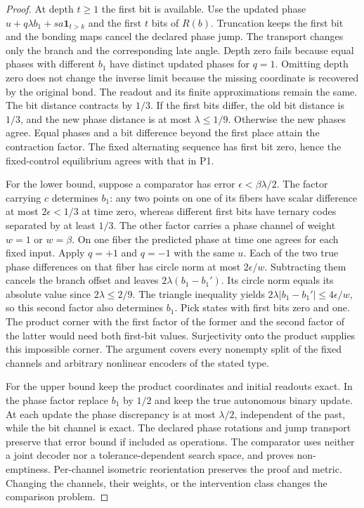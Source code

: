 \documentclass[11pt,a4paper]{article}
\theoremstyle{definition}
\begin{document}
\begin{proof}
At depth $t\ge1$ the first bit is available. Use the updated phase $u+q\lambda b_1+sa\mathbf 1_{t>k}$ and the first $t$ bits of $R(b)$. Truncation keeps the first bit and the bonding maps cancel the declared phase jump. The transport changes only the branch and the corresponding late angle. Depth zero fails because equal phases with different $b_1$ have distinct updated phases for $q=1$. Omitting depth zero does not change the inverse limit because the missing coordinate is recovered by the original bond. The readout and its finite approximations remain the same. The bit distance contracts by $1/3$. If the first bits differ, the old bit distance is $1/3$, and the new phase distance is at most $\lambda\le1/9$. Otherwise the new phases agree. Equal phases and a bit difference beyond the first place attain the contraction factor. The fixed alternating sequence has first bit zero, hence the fixed-control equilibrium agrees with that in P1.

For the lower bound, suppose a comparator has error $\epsilon<\beta\lambda/2$. The factor carrying $c$ determines $b_1$: any two points on one of its fibers have scalar difference at most $2\epsilon<1/3$ at time zero, whereas different first bits have ternary codes separated by at least $1/3$. The other factor carries a phase channel of weight $w=1$ or $w=\beta$. On one fiber the predicted phase at time one agrees for each fixed input. Apply $q=+1$ and $q=-1$ with the same $u$. Each of the two true phase differences on that fiber has circle norm at most $2\epsilon/w$. Subtracting them cancels the branch offset and leaves $2\lambda(b_1-b_1')$. Its circle norm equals its absolute value since $2\lambda\le2/9$. The triangle inequality yields $2\lambda|b_1-b_1'|\le4\epsilon/w$, so this second factor also determines $b_1$. Pick states with first bits zero and one. The product corner with the first factor of the former and the second factor of the latter would need both first-bit values. Surjectivity onto the product supplies this impossible corner. The argument covers every nonempty split of the fixed channels and arbitrary nonlinear encoders of the stated type.

For the upper bound keep the product coordinates and initial readouts exact. In the phase factor replace $b_1$ by $1/2$ and keep the true autonomous binary update. At each update the phase discrepancy is at most $\lambda/2$, independent of the past, while the bit channel is exact. The declared phase rotations and jump transport preserve that error bound if included as operations. The comparator uses neither a joint decoder nor a tolerance-dependent search space, and proves non-emptiness. Per-channel isometric reorientation preserves the proof and metric. Changing the channels, their weights, or the intervention class changes the comparison problem.


\end{proof}
\end{document}
